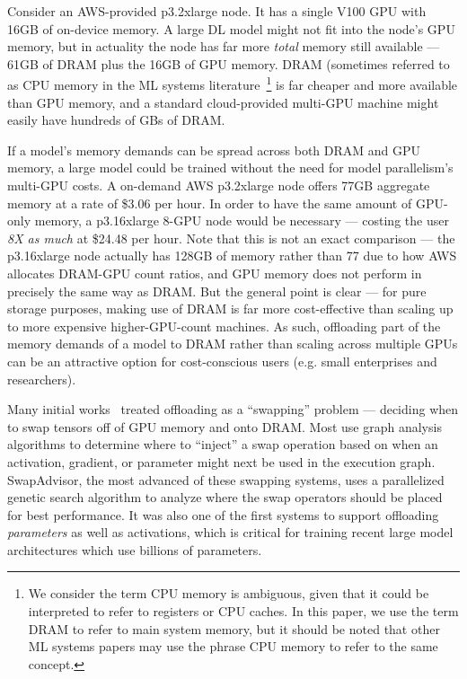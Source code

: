 Consider an AWS-provided p3.2xlarge node. It has a single V100 GPU with 16GB of on-device memory. A large DL model might not fit into the node's GPU memory, but in actuality the node has far more \textit{total} memory still available --- 61GB of DRAM plus the 16GB of GPU memory. DRAM (sometimes referred to as CPU memory in the ML systems literature~\footnote{We consider the term CPU memory is ambiguous, given that it could be interpreted to refer to registers or CPU caches. In this paper, we use the term DRAM to refer to main system memory, but it should be noted that other ML systems papers may use the phrase CPU memory to refer to the same concept.} is far cheaper and more available than GPU memory, and a standard cloud-provided multi-GPU machine might easily have hundreds of GBs of DRAM. 

If a model's memory demands can be spread across both DRAM and GPU memory, a large model could be trained without the need for model parallelism's multi-GPU costs. A on-demand AWS p3.2xlarge node offers 77GB aggregate memory at a rate of \$3.06 per hour. In order to have the same amount of GPU-only memory, a p3.16xlarge 8-GPU node would be necessary --- costing the user \textit{8X as much} at \$24.48 per hour.  Note that this is not an exact comparison --- the p3.16xlarge node actually has 128GB of memory rather than 77 due to how AWS allocates DRAM-GPU count ratios, and GPU memory does not perform in precisely the same way as DRAM. But the general point is clear --- for pure storage purposes, making use of DRAM is far more cost-effective than scaling up to more expensive higher-GPU-count machines. As such, offloading part of the memory demands of a model to DRAM rather than scaling across multiple GPUs can be an attractive option for cost-conscious users (e.g. small enterprises and researchers). 

Many initial works~\cite{tflms2019,meng2017,swapadvisor2021,vdnn2016,wang2018} treated offloading as a ``swapping'' problem --- deciding when to swap tensors off of GPU memory and onto DRAM. Most use graph analysis algorithms to determine where to ``inject'' a swap operation based on when an activation, gradient, or parameter might next be used in the execution graph. SwapAdvisor, the most advanced of these swapping systems, uses a parallelized genetic search algorithm to analyze where the swap operators should be placed for best performance. It was also one of the first systems to support offloading \textit{parameters} as well as activations, which is critical for training recent large model architectures which use billions of parameters.

